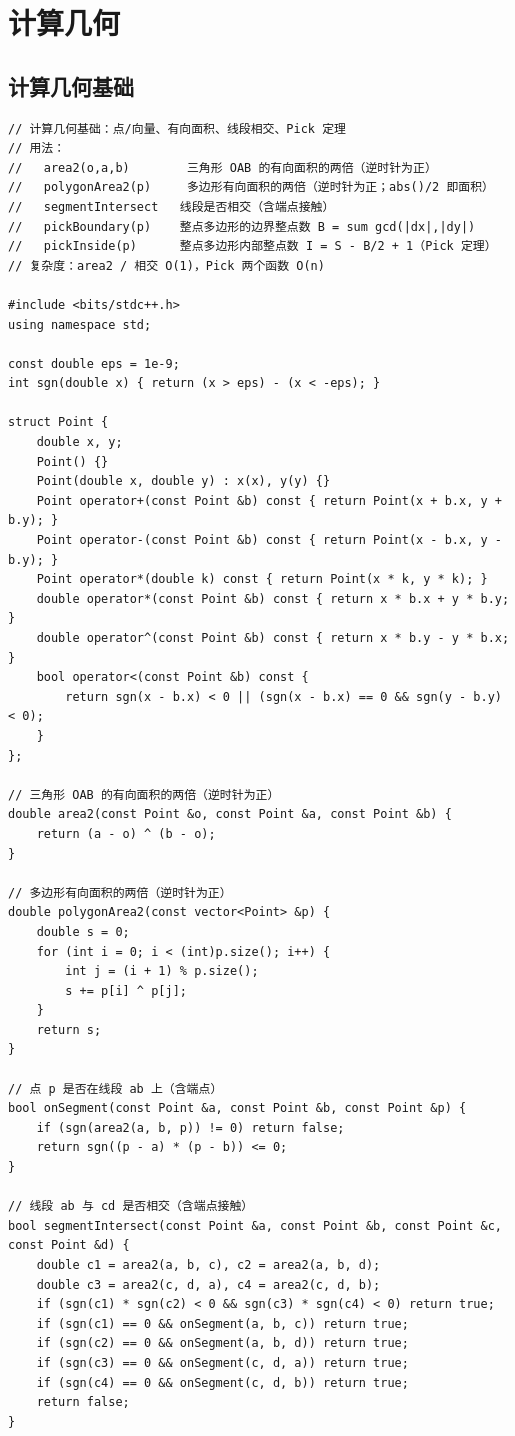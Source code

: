 \documentclass[11pt,a4paper]{ctexart}
\begin{document}
\section{计算几何}

\subsection{计算几何基础}

\begin{lstlisting}
// 计算几何基础：点/向量、有向面积、线段相交、Pick 定理
// 用法：
//   area2(o,a,b)        三角形 OAB 的有向面积的两倍（逆时针为正）
//   polygonArea2(p)     多边形有向面积的两倍（逆时针为正；abs()/2 即面积）
//   segmentIntersect   线段是否相交（含端点接触）
//   pickBoundary(p)    整点多边形的边界整点数 B = sum gcd(|dx|,|dy|)
//   pickInside(p)      整点多边形内部整点数 I = S - B/2 + 1（Pick 定理）
// 复杂度：area2 / 相交 O(1)，Pick 两个函数 O(n)

#include <bits/stdc++.h>
using namespace std;

const double eps = 1e-9;
int sgn(double x) { return (x > eps) - (x < -eps); }

struct Point {
    double x, y;
    Point() {}
    Point(double x, double y) : x(x), y(y) {}
    Point operator+(const Point &b) const { return Point(x + b.x, y + b.y); }
    Point operator-(const Point &b) const { return Point(x - b.x, y - b.y); }
    Point operator*(double k) const { return Point(x * k, y * k); }
    double operator*(const Point &b) const { return x * b.x + y * b.y; }
    double operator^(const Point &b) const { return x * b.y - y * b.x; }
    bool operator<(const Point &b) const {
        return sgn(x - b.x) < 0 || (sgn(x - b.x) == 0 && sgn(y - b.y) < 0);
    }
};

// 三角形 OAB 的有向面积的两倍（逆时针为正）
double area2(const Point &o, const Point &a, const Point &b) {
    return (a - o) ^ (b - o);
}

// 多边形有向面积的两倍（逆时针为正）
double polygonArea2(const vector<Point> &p) {
    double s = 0;
    for (int i = 0; i < (int)p.size(); i++) {
        int j = (i + 1) % p.size();
        s += p[i] ^ p[j];
    }
    return s;
}

// 点 p 是否在线段 ab 上（含端点）
bool onSegment(const Point &a, const Point &b, const Point &p) {
    if (sgn(area2(a, b, p)) != 0) return false;
    return sgn((p - a) * (p - b)) <= 0;
}

// 线段 ab 与 cd 是否相交（含端点接触）
bool segmentIntersect(const Point &a, const Point &b, const Point &c, const Point &d) {
    double c1 = area2(a, b, c), c2 = area2(a, b, d);
    double c3 = area2(c, d, a), c4 = area2(c, d, b);
    if (sgn(c1) * sgn(c2) < 0 && sgn(c3) * sgn(c4) < 0) return true;
    if (sgn(c1) == 0 && onSegment(a, b, c)) return true;
    if (sgn(c2) == 0 && onSegment(a, b, d)) return true;
    if (sgn(c3) == 0 && onSegment(c, d, a)) return true;
    if (sgn(c4) == 0 && onSegment(c, d, b)) return true;
    return false;
}


\end{lstlisting}
\end{document}
